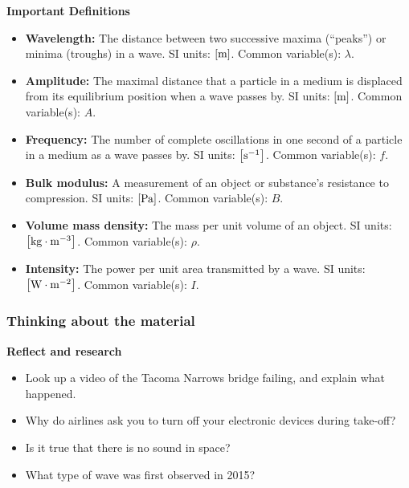 \begin{framed}
\textbf{Important Definitions}\\
\begin{itemize}
\item \textbf{Wavelength:} The distance between two successive maxima (``peaks'') or minima (troughs) in a wave. SI units: ${\rm \left[{m}\right]}$. Common variable(s): $\lambda$.
\item \textbf{Amplitude:} The maximal distance that a particle in a medium is displaced from its equilibrium position when a wave passes by. SI units: ${\rm \left[{m}\right]}$. Common variable(s): $A$.
\item \textbf{Frequency:} The number of complete oscillations in one second of a particle in a medium as a wave passes by. SI units: ${\rm \left[{s^{ -1}}\right]}$. Common variable(s): $f$.
\item \textbf{Bulk modulus:} A measurement of an object or substance's resistance to compression. SI units: ${\rm \left[{Pa}\right]}$. Common variable(s): $B$.
\item \textbf{Volume mass density:} The mass per unit volume of an object. SI units: ${\rm \left[{kg\cdot m^{ -3}}\right]}$. Common variable(s): $\rho$.
\item \textbf{Intensity:} The power per unit area transmitted by a wave. SI units: ${\rm \left[{W\cdot m^{ -2}}\right]}$. Common variable(s): $I$.
\end{itemize}
\end{framed}

\subsubsection{Thinking about the material}

\begin{framed}
\textbf{Reflect and research}\\
\begin{itemize}
\item Look up a video of the Tacoma Narrows bridge failing, and explain what happened.
\item Why do airlines ask you to turn off your electronic devices during take-off?
\item Is it true that there is no sound in space?
\item What type of wave was first observed in 2015?
\end{itemize}
\end{framed}

